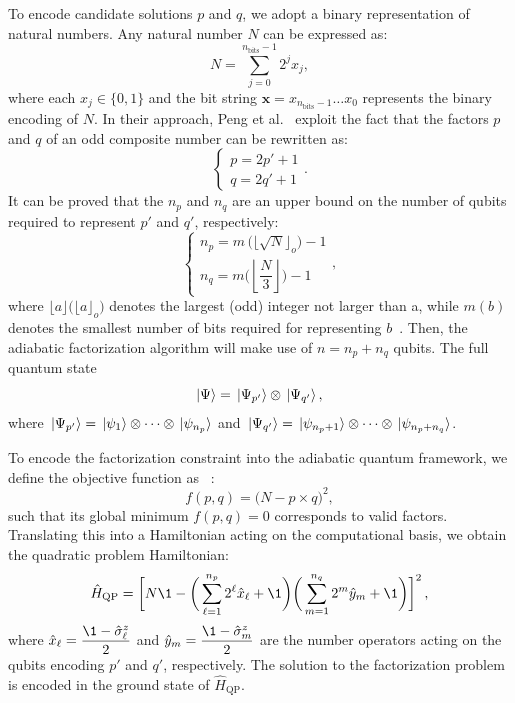 To encode candidate solutions $p$ and $q$, we adopt a binary representation of natural numbers. Any natural number $N$ can be expressed as:
\begin{equation}
	N = \sum_{j=0}^{n_\text{bits} - 1} 2^j x_j,
	\label{eq:binary_integer}
\end{equation}
where each $x_j \in \{0,1\}$ and the bit string $\mathbf{x} = x_{n_\text{bits}-1} \dots x_0$ represents the binary encoding of $N$. In their approach, Peng et al.~\cite{peng_quantum_2008} exploit the fact that the factors $p$ and $q$ of an odd composite number can be rewritten as:
\begin{equation}
	\begin{cases}
		p = 2p' + 1 \\
		q = 2q' + 1
	\end{cases} .
	\label{eq:factors_simplification}
\end{equation}
It can be proved that the $n_p$ and $n_q$ are an upper bound on the number of qubits required to represent $p'$ and $q'$, respectively:
\begin{equation}
	\begin{cases}
		n_p = m\,\big(\lfloor \sqrt{N} \rfloor_o\big) - 1 \\[2ex]
		n_q = m\bigg(\left\lfloor \dfrac{N}{3} \right\rfloor \bigg) - 1
	\end{cases} ,
	\label{eq:factors_num_bits}
\end{equation}
where $\lfloor a \rfloor \big(\lfloor a \rfloor_o\big)$ denotes the largest (odd) integer not larger than a, while $m(b)$ denotes the smallest number of bits required for representing $b$~\cite{peng_quantum_2008}. Then, the adiabatic factorization algorithm will make use of $n = n_p + n_q$ qubits. The full quantum state 
\begin{equation}
	\ket{\Psi} = \ket*{\Psi_{p'}} \otimes \ket*{\Psi_{q'}},
	\label{eq:full_quantum_state}
\end{equation}
where $\ket*{\Psi_{p'}} = \ket*{\psi_{1}}\otimes \cdots \otimes \ket*{\psi_{n_p}}$ and $\ket*{\Psi_{q'}} = \ket*{\psi_{n_p+1}}\otimes \cdots \otimes \ket*{\psi_{n_p +n_q}}$.

To encode the factorization constraint into the adiabatic quantum framework, we define the objective function as ~\cite{peng_quantum_2008}:
\begin{equation}
	f(p,q) = \big(N - p \times q \big)^2,
\end{equation}
such that its global minimum $f(p,q)=0$ corresponds to valid factors. Translating this into a Hamiltonian acting on the computational basis, we obtain the quadratic problem Hamiltonian:
\begin{equation}
	\hat{H}_\mathrm{QP} = \bigg[ N \1 - \bigg( \sum_{\ell=1}^{n_p} 2^\ell \hat{x}_\ell + \1 \bigg)
	\bigg( \sum_{m=1}^{n_q} 2^m \hat{y}_m + \1 \bigg) \bigg]^2\,,
	\label{eq:quadratic_problem_hamiltonian}
\end{equation}
where $\hat{x}_\ell = \dfrac{\1 - \hat{\sigma}_\ell^z}{2}$ and $\hat{y}_m = \dfrac{\1 - \hat{\sigma}_m^z}{2}$ are the number operators acting on the qubits encoding $p'$ and $q'$, respectively. The solution to the factorization problem is encoded in the ground state of $\hat{H}_\mathrm{QP}$.

